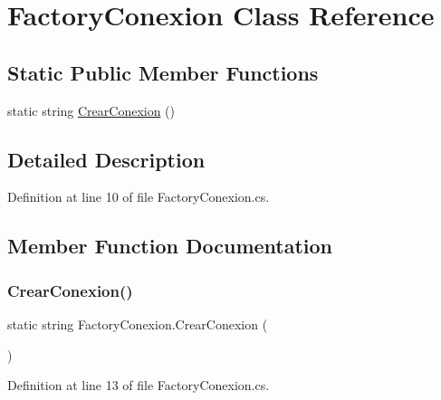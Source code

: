 \hypertarget{class_factory_conexion}{}\section{Factory\+Conexion Class Reference}
\label{class_factory_conexion}
\subsection*{Static Public Member Functions}
\begin{DoxyCompactItemize}
\item 
static string \hyperlink{class_factory_conexion_a60b8273ea64496e9eaa9aab3c033fb76}{Crear\+Conexion} ()
\end{DoxyCompactItemize}


\subsection{Detailed Description}


Definition at line 10 of file Factory\+Conexion.\+cs.



\subsection{Member Function Documentation}
\hypertarget{class_factory_conexion_a60b8273ea64496e9eaa9aab3c033fb76}{}\label{class_factory_conexion_a60b8273ea64496e9eaa9aab3c033fb76} 
\subsubsection{\texorpdfstring{Crear\+Conexion()}{CrearConexion()}}
{\footnotesize\ttfamily static string Factory\+Conexion.\+Crear\+Conexion (\begin{DoxyParamCaption}{ }\end{DoxyParamCaption})\hspace{0.3cm}{\ttfamily [static]}}



Definition at line 13 of file Factory\+Conexion.\+cs.

